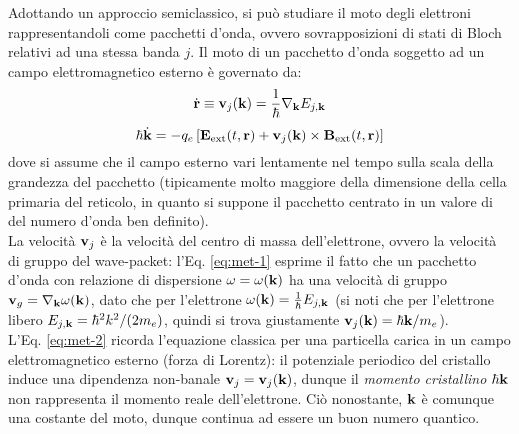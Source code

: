 
Adottando un approccio semiclassico, si può studiare il moto degli elettroni rappresentandoli come pacchetti d'onda, ovvero sovrapposizioni di stati di Bloch relativi ad una stessa banda $ j $. Il moto di un pacchetto d'onda soggetto ad un campo elettromagnetico esterno è governato da:
\begin{equation}
	\dot{\mathbf{r}} \equiv \mathbf{v}_j(\mathbf{k}) = \frac{1}{\hbar} \nabla_{\mathbf{k}} E_{j,\mathbf{k}}
	\label{eq:met-1}
\end{equation}
\begin{equation}
	\hbar \dot{\mathbf{k}} = -q_e \left[ \mathbf{E}_\text{ext}(t,\mathbf{r}) + \mathbf{v}_j(\mathbf{k}) \times \mathbf{B}_\text{ext}(t,\mathbf{r}) \right]
	\label{eq:met-2}
\end{equation}
dove si assume che il campo esterno vari lentamente nel tempo sulla scala della grandezza del pacchetto (tipicamente molto maggiore della dimensione della cella primaria del reticolo, in quanto si suppone il pacchetto centrato in un valore di del numero d'onda ben definito). \\
La velocità $ \mathbf{v}_j $ è la velocità del centro di massa dell'elettrone, ovvero la velocità di gruppo del wave-packet: l'Eq. \ref{eq:met-1} esprime il fatto che un pacchetto d'onda con relazione di dispersione $ \omega = \omega(\mathbf{k}) $ ha una velocità di gruppo $ \mathbf{v}_g = \nabla_{\mathbf{k}} \omega(\mathbf{k}) $, dato che per l'elettrone $ \omega(\mathbf{k}) = \frac{1}{\hbar} E_{j,\mathbf{k}} $ (si noti che per l'elettrone libero $ E_{j,\mathbf{k}} = \hbar^2 k^2 / (2m_e) $, quindi si trova giustamente $ \mathbf{v}_j(\mathbf{k}) = \hbar \mathbf{k} / m_e $). \\
L'Eq. \ref{eq:met-2} ricorda l'equazione classica per una particella carica in un campo elettromagnetico esterno (forza di Lorentz): il potenziale periodico del cristallo induce una dipendenza non-banale $ \mathbf{v}_j = \mathbf{v}_j(\mathbf{k}) $, dunque il \textit{momento cristallino} $ \hbar \mathbf{k} $ non rappresenta il momento reale dell'elettrone\footnotemark. Ciò nonostante, $ \mathbf{k} $ è comunque una costante del moto, dunque continua ad essere un buon numero quantico.


